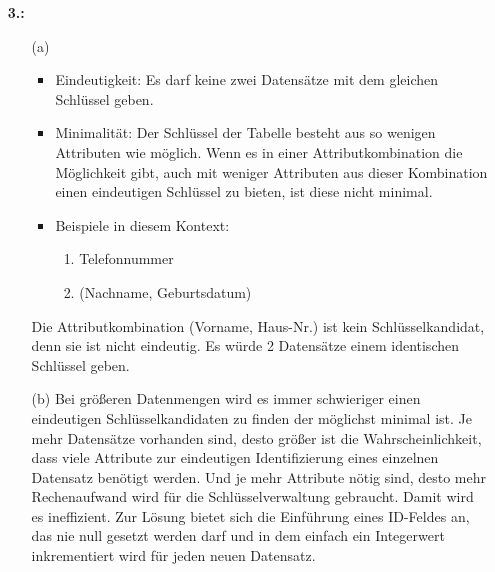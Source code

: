 \documentclass[a4paper,11pt,fleqn]{scrartcl}
\begin{document}
\begin{enumerate}
	\item[\textbf{3.:}]
	\begin{enumerate}
		\item[(a)]
			\begin{itemize}
				\item Eindeutigkeit: Es darf keine zwei Datensätze mit dem gleichen Schlüssel geben.
				\item Minimalität: Der Schlüssel der Tabelle besteht aus so wenigen Attributen wie möglich. Wenn es in einer 
				Attributkombination die Möglichkeit gibt, auch mit weniger Attributen aus dieser Kombination einen eindeutigen 
				Schlüssel zu bieten, ist diese nicht minimal.
				\item Beispiele in diesem Kontext:
				\begin{enumerate}
					\item Telefonnummer
					\item (Nachname, Geburtsdatum)
				\end{enumerate}
			\end{itemize}
			Die Attributkombination (Vorname, Haus-Nr.) ist kein Schlüsselkandidat, denn sie ist nicht eindeutig. Es würde 2 
			Datensätze einem identischen Schlüssel geben. \\ 

		\item[(b)]
			Bei größeren Datenmengen wird es immer schwieriger einen eindeutigen Schlüsselkandidaten zu finden der möglichst 
			minimal ist. Je mehr Datensätze vorhanden sind, desto größer ist die Wahrscheinlichkeit, dass viele Attribute zur 
			eindeutigen Identifizierung eines einzelnen Datensatz benötigt werden. Und je mehr Attribute nötig sind, desto mehr 
			Rechenaufwand wird für die Schlüsselverwaltung gebraucht. Damit wird es ineffizient. Zur Lösung bietet sich die 
			Einführung eines ID-Feldes an, das nie null gesetzt werden darf und in dem einfach ein Integerwert inkrementiert 
			wird für jeden neuen Datensatz. 	
		\end{enumerate}	
	\end{enumerate}
\end{document}

